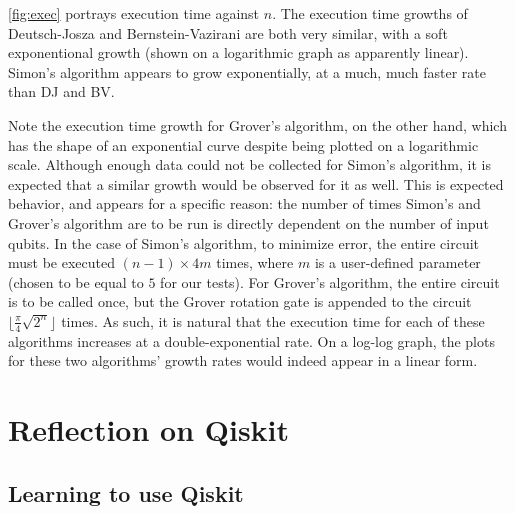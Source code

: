 \documentclass[12pt]{article}
\begin{document}
\autoref{fig:exec} portrays execution time against $n$.
The execution time growths of Deutsch-Josza and Bernstein-Vazirani are both very similar, with a soft exponentional growth (shown on a logarithmic graph as apparently linear).
Simon's algorithm appears to grow exponentially, at a much, much faster rate than DJ and BV.

Note the execution time growth for Grover's algorithm, on the other hand, which has the shape of an exponential curve despite being plotted on a logarithmic scale.
Although enough data could not be collected for Simon's algorithm, it is expected that a similar growth would be observed for it as well.
This is expected behavior, and appears for a specific reason: the number of times Simon's and Grover's algorithm are to be run is directly dependent on the number of input qubits.
In the case of Simon's algorithm, to minimize error, the entire circuit must be executed $(n-1)\times4m$ times, where $m$ is a user-defined parameter (chosen to be equal to $5$ for our tests).
For Grover's algorithm, the entire circuit is to be called once, but the Grover rotation gate is appended to the circuit $\lfloor\frac{\pi}{4}\sqrt{2^n}\rfloor$ times.
As such, it is natural that the execution time for each of these algorithms increases at a double-exponential rate.
On a log-log graph, the plots for these two algorithms' growth rates would indeed appear in a linear form.

\section{Reflection on Qiskit}

\subsection{Learning to use Qiskit}
\end{document}
